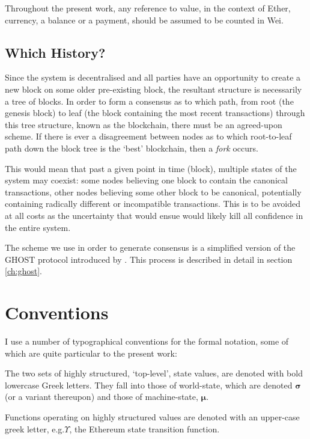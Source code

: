 \documentclass[9pt,oneside]{amsart}
\makeatletter
\newcommand*\eg{e.g.\@\xspace}
\makeatother
\begin{document}
\begin{multicols}{2}
Throughout the present work, any reference to value, in the context of Ether, currency, a balance or a payment, should be assumed to be counted in Wei.

\subsection{Which History?}

Since the system is decentralised and all parties have an opportunity to create a new block on some older pre-existing block, the resultant structure is necessarily a tree of blocks. In order to form a consensus as to which path, from root (the genesis block) to leaf (the block containing the most recent transactions) through this tree structure, known as the blockchain, there must be an agreed-upon scheme. If there is ever a disagreement between nodes as to which root-to-leaf path down the block tree is the `best' blockchain, then a \textit{fork} occurs.

This would mean that past a given point in time (block), multiple states of the system may coexist: some nodes believing one block to contain the canonical transactions, other nodes believing some other block to be canonical, potentially containing radically different or incompatible transactions. This is to be avoided at all costs as the uncertainty that would ensue would likely kill all confidence in the entire system.

The scheme we use in order to generate consensus is a simplified version of the GHOST protocol introduced by \cite{cryptoeprint:2013:881}. This process is described in detail in section \ref{ch:ghost}.

\section{Conventions}\label{ch:conventions}

I use a number of typographical conventions for the formal notation, some of which are quite particular to the present work:

The two sets of highly structured, `top-level', state values, are denoted with bold lowercase Greek letters. They fall into those of world-state, which are denoted $\boldsymbol{\sigma}$ (or a variant thereupon) and those of machine-state, $\boldsymbol{\mu}$.

Functions operating on highly structured values are denoted with an upper-case greek letter, \eg $\Upsilon$, the Ethereum state transition function.


\end{multicols}
\end{document}
